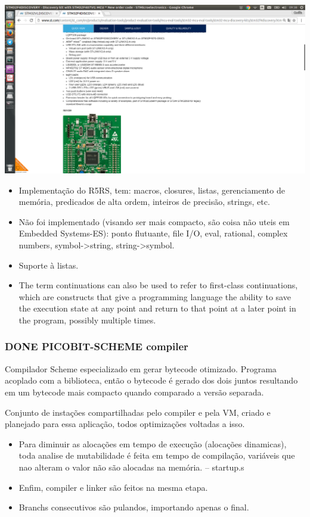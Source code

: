 \documentclass[11pt]{article}
\begin{document}
\includegraphics[width=.9\linewidth]{stm32f4.png}

\begin{itemize}
\item Implementação do R5RS, tem: macros, closures, listas, gerenciamento de memória, predicados de alta ordem, inteiros de precisão, strings, etc.
\item Não foi implementado (visando ser mais compacto, são coisa não uteis em Embedded Systems-ES): ponto flutuante, file I/O, eval, rational, complex numbers, symbol->string, string->symbol.
\item Suporte à listas.
\item The term continuations can also be used to refer to first-class continuations, which are constructs that give a programming language the ability to save the execution state at any point and return to that point at a later point in the program, possibly multiple times.
\end{itemize}

\subsubsection{{\bfseries\sffamily DONE} PICOBIT-SCHEME compiler}
\label{sec-5-2-1}

Compilador Scheme especializado em gerar bytecode otimizado. Programa acoplado com a biblioteca, então o bytecode é gerado dos dois juntos resultando em um bytecode mais compacto quando comparado a versão separada.

Conjunto de instações compartilhadas pelo compiler e pela VM, criado e planejado para essa aplicação, todos optimizações voltadas a isso.

\begin{itemize}
\item Para diminuir as alocações em tempo de execução (alocações dinamicas), toda analise de mutabilidade é feita em tempo de compilação, variáveis que nao alteram o valor não são alocadas na memória.   --   startup.s
\item Enfim, compiler e linker são feitos na mesma etapa.
\item Branchs consecutivos são pulandos, importando apenas o final.
\end{itemize}
\end{document}

